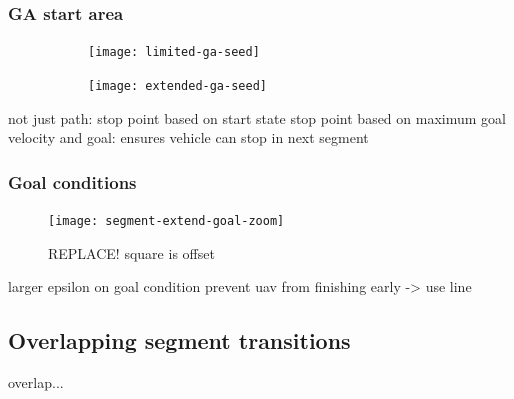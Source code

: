 \subsubsection{GA start area}
\begin{figure}
	\centering
	\begin{subfigure}[t]{0.45\columnwidth}
        		\texttt{[image: limited-ga-seed]}
        		\caption{}
        		\label{fig:ga-seed-pre}
	\end{subfigure}
	\hfil
	\begin{subfigure}[t]{0.45\columnwidth}
        		\texttt{[image: extended-ga-seed]}
        		\caption{}
        		 \label{fig:ga-seed-post}
	\end{subfigure}	
    \caption{}
    \label{fig:ga-seed}     
\end{figure}
not just path: stop point based on start state
stop point based on  maximum goal velocity and goal: ensures vehicle can stop in next segment

\subsubsection{Goal conditions}
\begin{figure}[]
	\centering
	\texttt{[image: segment-extend-goal-zoom]}
	\caption{REPLACE! square is offset}
	\label{fig:extended-goal-zoom}
\end{figure}

larger epsilon on goal condition
prevent uav from finishing early -> use line

\subsection{Overlapping segment transitions}
overlap...
